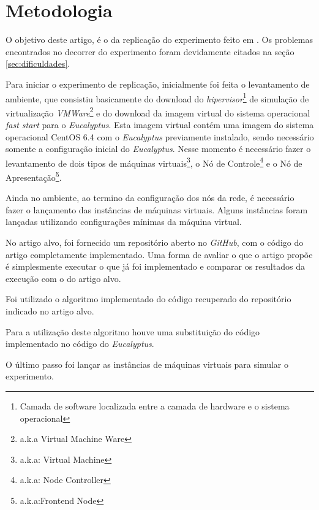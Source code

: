 \section{Metodologia}

O objetivo deste artigo, é o da replicação do experimento feito em \cite{elaine_et_al:14}. Os problemas encontrados no decorrer do experimento foram devidamente citados na seção \ref{sec:dificuldades}.

Para iniciar o experimento de replicação, inicialmente foi feita o levantamento de ambiente, que consistiu basicamente do download do \textit{hipervisor}\footnote{Camada de software localizada entre a camada de hardware e o sistema operacional\cite{dev_midia}} de simulação de virtualização \textit{VMWare}\footnote{a.k.a Virtual Machine Ware} e do download da imagem virtual do sistema operacional \textit{fast start} para o \textit{Eucalyptus}. Esta imagem virtual contém uma imagem do sistema operacional CentOS 6.4 com o \textit{Eucalyptus} previamente instalado, sendo necessário somente a configuração inicial do \textit{Eucalyptus}. Nesse momento é necessário fazer o levantamento de dois tipos de máquinas virtuais\footnote{a.k.a: Virtual Machine}, o Nó de Controle\footnote{a.k.a: Node Controller} e o Nó de Apresentação\footnote{a.k.a:Frontend Node}.

Ainda no ambiente, ao termino da configuração dos nós da rede, é necessário fazer o lançamento das instâncias de máquinas virtuais. Alguns instâncias foram lançadas utilizando configurações mínimas da máquina virtual.

No artigo alvo, foi fornecido um repositório aberto no \textit{GitHub}, com o código do artigo completamente implementado. Uma forma de avaliar o que o artigo propõe é simplesmente executar o que já foi implementado e comparar os resultados da execução com o do artigo alvo.

Foi utilizado o algoritmo implementado do código recuperado do repositório indicado no artigo alvo.

Para a utilização deste algoritmo houve uma substituição do código implementado no código do \textit{Eucalyptus}.

O último passo foi lançar as instâncias de máquinas virtuais para simular o experimento. 
